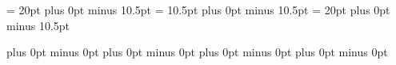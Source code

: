 \pagestyle{fancy}               %
\renewcommand{\chaptermark}[1]{%
    \markboth{\chaptername~\ #1}{}}
\fancyhf{}%
\fancyhead[CO]{\songti \wuhao \leftmark}    %
\fancyfoot[C]{\songti \xiaowu ~\thepage~}   %
\renewcommand{\headrulewidth}{0.5pt}        %
\renewcommand{\footrulewidth}{0pt}          %
\setlength{\footskip}{20pt}                 %

\fancypagestyle{plain}{%
    \fancyhf{}                  %
    \fancyfoot[C]{\songti \xiaowu ~\thepage~ }  %
    \renewcommand{\headrulewidth}{0pt}          %
    \renewcommand{\footrulewidth}{0pt}          %
}

\renewcommand{\bibname}{参考文献}

\renewcommand{\tablename}{表}
\renewcommand{\thetable}{\arabic{chapter}-\arabic{table}}
\renewcommand{\figurename}{图}
\renewcommand{\thefigure}{\arabic{chapter}-\arabic{figure}}
\renewcommand{\thesubfigure}{(\alph{subfigure})}
\renewcommand{\thesubtable}{(\alph{subtable})}
\newcommand{\tabfont}{\fontsize{10.5}{20}\selectfont}     %
\captionsetup{labelsep=space}   %
\captionsetup{font=singlespacing,labelsep=space}%
\captionsetup[subfloat]{labelformat=simple}
\renewcommand{\captionfont}{\fontsize{12pt}{20pt}\selectfont}
\captionsetup[table]{position=top,skip=0pt}
\captionsetup[figure]{position=bottom,skip=0pt,belowskip=-10.5pt}
\textfloatsep = 20pt plus 0pt minus 10.5pt
\floatsep = 10.5pt plus 0pt minus 10.5pt
\intextsep= 20pt plus 0pt minus 10.5pt

\renewcommand{\theequation}{\arabic{chapter}-\arabic{equation}}
\abovedisplayskip=10.5pt plus 0pt minus 0pt
\belowdisplayskip=10.5pt plus 0pt minus 0pt
\abovedisplayshortskip=10.5pt plus 0pt minus 0pt
\belowdisplayshortskip=10.5pt plus 0pt minus 0pt











